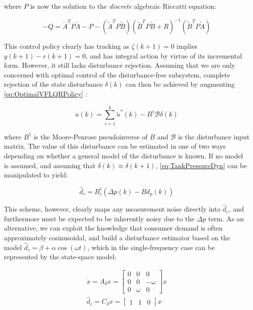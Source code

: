 where $P$ is now the solution to the \textit{discrete} algebraic Riccatti equation:

\begin{equation}\label{eq:DARE}
	-Q = \tilde{A}^TP\tilde{A} - P - (\tilde{A}^TP\tilde{B})(\tilde{B}^TP\tilde{B}+R)^{-1}(\tilde{B}^TP\tilde{A})
\end{equation}

This control policy clearly has tracking as $\zeta(k+1) = 0$ implies $y(k+1)-r(k+1) = 0$, and has integral action by virtue of its incremental form. However, it still lacks disturbance rejection. Assuming that we are only concerned with optimal control of the disturbance-free subsystem, complete rejection of the state disturbance $\delta(k)$ can then be achieved by augmenting \cref{eq:OptimalVFLQRPolicy} \cite{Singh2017}:

\begin{equation}
	u(k) = \sum_{i=1}^{k} \tilde{u}^*(k) - B^\dagger \mathcal{B}\delta(k)
\end{equation}

where $B^\dagger$ is the Moore-Penrose pseudoinverse of $B$ and $\mathcal{B}$ is the disturbance input matrix. The value of this disturbance can be estimated in one of two ways depending on whether a general model of the disturbance is known. If no model is assumed, and assuming that $\delta(k) \approx \delta(k+1)$, \cref{eq:TankPressureDyn} can be manipulated to yield:

\begin{equation}\label{eq:AgnosticDisturbanceEstimation}
	\hat{d}_c = B_c^\dagger (\Delta p(k) - Bd_p(k))
\end{equation}

This scheme, however, clearly maps any measurement noise directly into $\hat{d}_c$, and furthermore must be expected to be inherently noisy due to the $\Delta p$ term. As an alternative, we can exploit the knowledge that consumer demand is often approximately cosinusoidal, and build a disturbance estimator based on the model $\hat{d}_c = \beta + \alpha\cos(\omega t)$, which in the single-frequency case can be represented by the state-space model:

\begin{equation}\label{eq:TheisticDisturbanceEstimator}
	\begin{gathered}
		\dot{x} = A_\delta x =  \begin{bmatrix}0 & 0 & 0 \\ 0 & 0 & -\omega \\ 0 & \omega & 0	\end{bmatrix}x \\
		\hat{d}_c = C_\delta x = \begin{bmatrix} 1 & 1 & 0 \end{bmatrix} x
	\end{gathered}
\end{equation}

